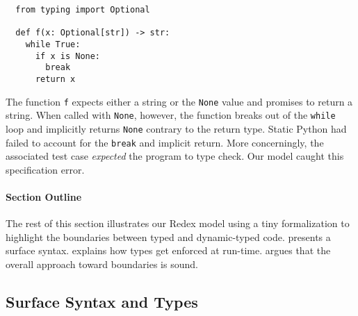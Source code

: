 \documentclass[english,cleveref,crc]{programming}
\newcommand{\SP}{Static Python}
\newcommand{\code}[1]{\texttt{#1}}
\begin{document}
\noindent\null\hspace*{-.5em} %
\begin{minipage}{\linewidth}
\begin{lstlisting}
  from typing import Optional

  def f(x: Optional[str]) -> str:
    while True:
      if x is None:
        break
      return x
\end{lstlisting}
%
\end{minipage}

\noindent{}The function \code{f} expects either a string or the \code{None} value and promises to return a string.
When called with \code{None}, however, the function breaks out of the \code{while} loop
and implicitly returns \code{None} contrary to the return type.
\SP{} had failed to account for the \code{break} and implicit return.
More concerningly, the associated test case \emph{expected} the program to type check.
Our model caught this specification error.


\paragraph{Section Outline}


The rest of this section illustrates our Redex model using a tiny
formalization to highlight the boundaries between typed and dynamic-typed
code.
 presents a surface syntax.
 explains how types get enforced at run-time.
 argues that the overall approach toward boundaries is sound.


\subsection{Surface Syntax and Types}
\label{s:surface}
\end{document}
